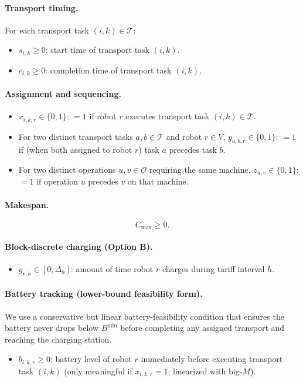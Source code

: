 \documentclass[preprint, 3p, review, 12pt]{elsarticle}
\begin{document}
\paragraph{Transport timing.}
For each transport task $(i,k)\in\mathcal{T}$:
\begin{itemize}
  \item $s_{i,k}\ge 0$: start time of transport task $(i,k)$.
  \item $c_{i,k}\ge 0$: completion time of transport task $(i,k)$.
\end{itemize}

\paragraph{Assignment and sequencing.}
\begin{itemize}
  \item $x_{i,k,r}\in\{0,1\}$: $=1$ if robot $r$ executes transport task $(i,k)\in\mathcal{T}$.
  \item For two distinct transport tasks $a,b\in\mathcal{T}$ and robot $r\in V$,
  $y_{a,b,r}\in\{0,1\}$: $=1$ if (when both assigned to robot $r$) task $a$ precedes task $b$.
  \item For two distinct operations $u,v\in\mathcal{O}$ requiring the same machine,
  $z_{u,v}\in\{0,1\}$: $=1$ if operation $u$ precedes $v$ on that machine.
\end{itemize}

\paragraph{Makespan.}
\[
C_{\max}\ge 0.
\]

\paragraph{Block-discrete charging (Option B).}
\begin{itemize}
  \item $g_{r,h}\in[0,\Delta_h]$: amount of time robot $r$ charges during tariff interval $h$.
\end{itemize}

\paragraph{Battery tracking (lower-bound feasibility form).}
We use a conservative but linear battery-feasibility condition that ensures the battery never drops below $B^{\min}$
before completing any assigned transport and reaching the charging station.
\begin{itemize}
  \item $b_{i,k,r}\ge 0$: battery level of robot $r$ immediately before executing transport task $(i,k)$
  (only meaningful if $x_{i,k,r}=1$; linearized with big-$M$).
\end{itemize}
\end{document}
